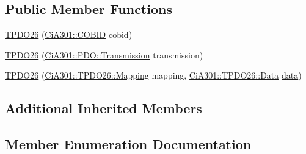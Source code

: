 \subsection*{Public Member Functions}
\begin{DoxyCompactItemize}
\item 
\hyperlink{struct_ci_a301_1_1_t_p_d_o26_a00727cc64d4d8cc30be1c358927c4289}{T\+P\+D\+O26} (\hyperlink{namespace_ci_a301_aec5b5dbb2b60d2837c60499f6f297aa7}{Ci\+A301\+::\+C\+O\+B\+I\+D} cobid)
\item 
\hyperlink{struct_ci_a301_1_1_t_p_d_o26_a2a1f5d95c45730150ae92d9ce8c506f9}{T\+P\+D\+O26} (\hyperlink{namespace_ci_a301_1_1_p_d_o_a6c7a5941fe4f869dd1703fb7ce7f6549}{Ci\+A301\+::\+P\+D\+O\+::\+Transmission} transmission)
\item 
\hyperlink{struct_ci_a301_1_1_t_p_d_o26_a801d3099d06ff1038ff5ea6af3c31af9}{T\+P\+D\+O26} (\hyperlink{struct_ci_a301_1_1_t_p_d_o26_ad26fbc2e8ca095342bf5ca3ad7b3a568}{Ci\+A301\+::\+T\+P\+D\+O26\+::\+Mapping} mapping, \hyperlink{struct_ci_a301_1_1_object_a9fd091097bb03da4a28a403485c3a10f}{Ci\+A301\+::\+T\+P\+D\+O26\+::\+Data} \hyperlink{struct_ci_a301_1_1_object_a73870d74c7ffaaf07515bf4a5d5330ea}{data})
\end{DoxyCompactItemize}
\subsection*{Additional Inherited Members}


\subsection{Member Enumeration Documentation}
\hypertarget{struct_ci_a301_1_1_t_p_d_o26_ad26fbc2e8ca095342bf5ca3ad7b3a568}{}
